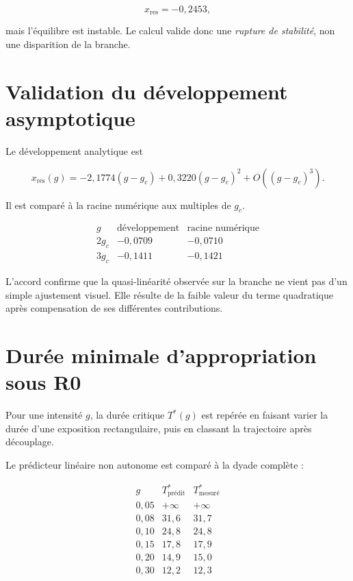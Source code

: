 \[
x_{\mathrm{res}}=-0{,}2453,
\]

mais l'équilibre est instable. Le calcul valide donc une
\emph{rupture de stabilité}, non une disparition de la branche.

\section{Validation du développement asymptotique}
\label{annexe-num-asymptotique-resistance}

Le développement analytique est

\[
x_{\mathrm{res}}(g)
=
-2{,}1774(g-g_c)
+
0{,}3220(g-g_c)^2
+
O\left((g-g_c)^3\right).
\]

Il est comparé à la racine numérique aux multiples de \(g_c\).

\[
\begin{array}{c|cc}
g & \text{développement} & \text{racine numérique}\\
\hline
2g_c & -0{,}0709 & -0{,}0710\\
3g_c & -0{,}1411 & -0{,}1421
\end{array}
\]

L'accord confirme que la quasi-linéarité observée sur la branche ne
vient pas d'un simple ajustement visuel. Elle résulte de la faible
valeur du terme quadratique après compensation de ses différentes
contributions.

\section{Durée minimale d'appropriation sous R0}
\label{annexe-num-tstar-r0}

Pour une intensité \(g\), la durée critique \(T^\ast(g)\) est repérée
en faisant varier la durée d'une exposition rectangulaire, puis en
classant la trajectoire après découplage.

Le prédicteur linéaire non autonome est comparé à la dyade complète :

\[
\begin{array}{c|cc}
g & T^\ast_{\text{prédit}} & T^\ast_{\text{mesuré}}\\
\hline
0{,}05 & +\infty & +\infty\\
0{,}08 & 31{,}6 & 31{,}7\\
0{,}10 & 24{,}8 & 24{,}8\\
0{,}15 & 17{,}8 & 17{,}9\\
0{,}20 & 14{,}9 & 15{,}0\\
0{,}30 & 12{,}2 & 12{,}3
\end{array}
\]


